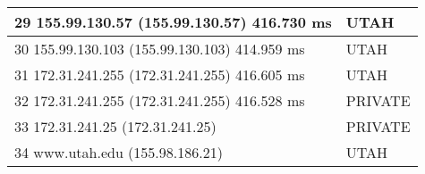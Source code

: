 \begin{table}[!ht]
\begin{tabular}{|l|l|}
29  155.99.130.57 (155.99.130.57)  416.730 ms                               & UTAH                                                                            \\ \hline
30  155.99.130.103 (155.99.130.103)  414.959 ms                             & UTAH                                                                            \\ \hline
31  172.31.241.255 (172.31.241.255)  416.605 ms                             & UTAH                                                                            \\ \hline
32  172.31.241.255 (172.31.241.255)  416.528 ms                             & PRIVATE                                                                         \\ \hline
33  172.31.241.25 (172.31.241.25)                                           & PRIVATE                                                                         \\ \hline
34  www.utah.edu (155.98.186.21)                                            & UTAH                                                                            \\ \hline
\end{tabular}
\end{table}
